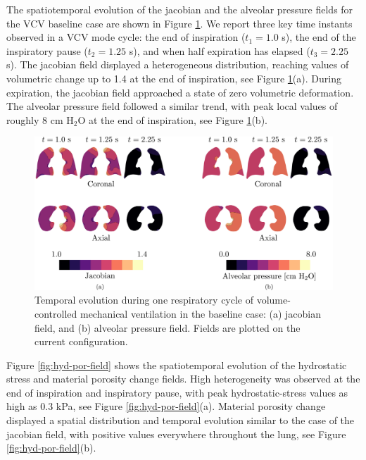 \documentclass[preprint,3p,12pt,number,sort&compress]{elsarticle}
\begin{document}
The spatiotemporal evolution of the jacobian and the alveolar pressure fields for the VCV baseline case are shown in Figure \ref{fig:jac-press-fields}. We report three key time instants observed in a VCV mode cycle: the end of inspiration ($t_1=1.0$ s), the end of the inspiratory pause ($t_2=1.25$ s), and when half expiration has elapsed ($t_3= 2.25$ s). The jacobian field displayed a heterogeneous distribution, reaching values of volumetric change up to 1.4 at the end of inspiration, see Figure \ref{fig:jac-press-fields}(a). During expiration, the jacobian field approached a state of zero volumetric deformation. The alveolar pressure field followed a similar trend, with peak local values of roughly 8 cm H$_2$O at the end of inspiration, see Figure \ref{fig:jac-press-fields}(b).   


\begin{figure}[h!]
    \begin{center}
    \includegraphics[width=1 \textwidth]{./Figures/jacpres.pdf}
    \caption[]{Temporal evolution during one respiratory cycle of volume-controlled
mechanical ventilation in the baseline case: (a) jacobian field, and (b) alveolar pressure field. Fields are plotted on the current configuration.}
    \label{fig:jac-press-fields}
    \end{center}
\end{figure}

Figure \ref{fig:hyd-por-field} shows the spatiotemporal evolution of the hydrostatic stress and material porosity change fields. High heterogeneity was observed at the end of inspiration and inspiratory pause, with peak hydrostatic-stress values as high as 0.3 kPa, see Figure \ref{fig:hyd-por-field}(a). Material porosity change displayed a spatial distribution and temporal evolution similar to the case of the jacobian field, with positive values everywhere throughout the lung, see Figure \ref{fig:hyd-por-field}(b).
\end{document}
